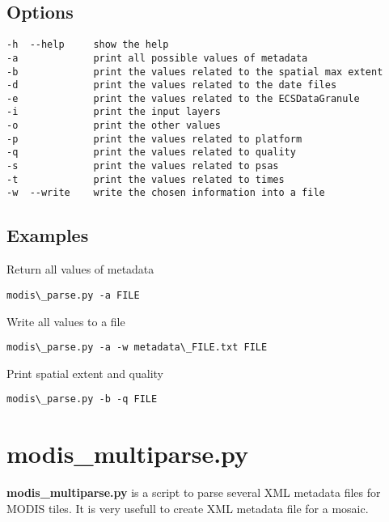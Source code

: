 \documentclass[a4paper,11pt,oneside]{sphinxmanual}
\begin{document}
\subsection{Options}
\label{scripts/modis_parse:options}
\begin{Verbatim}[commandchars=\\\{\}]
-h  --help     show the help
-a             print all possible values of metadata
-b             print the values related to the spatial max extent
-d             print the values related to the date files
-e             print the values related to the ECSDataGranule
-i             print the input layers
-o             print the other values
-p             print the values related to platform
-q             print the values related to quality
-s             print the values related to psas
-t             print the values related to times
-w  --write    write the chosen information into a file
\end{Verbatim}


\subsection{Examples}
\label{scripts/modis_parse:examples}
Return all values of metadata

\begin{Verbatim}[commandchars=\\\{\}]
modis\_parse.py -a FILE
\end{Verbatim}

Write all values to a file

\begin{Verbatim}[commandchars=\\\{\}]
modis\_parse.py -a -w metadata\_FILE.txt FILE
\end{Verbatim}

Print spatial extent and quality

\begin{Verbatim}[commandchars=\\\{\}]
modis\_parse.py -b -q FILE
\end{Verbatim}
\newpage %

\section{modis\_multiparse.py}
\label{scripts/modis_multiparse:modis-multiparse-py}\label{scripts/modis_multiparse::doc}
\textbf{modis\_multiparse.py} is a script to parse several XML metadata files
for MODIS tiles. It is very usefull to create XML metadata file for a
mosaic.
\end{document}
